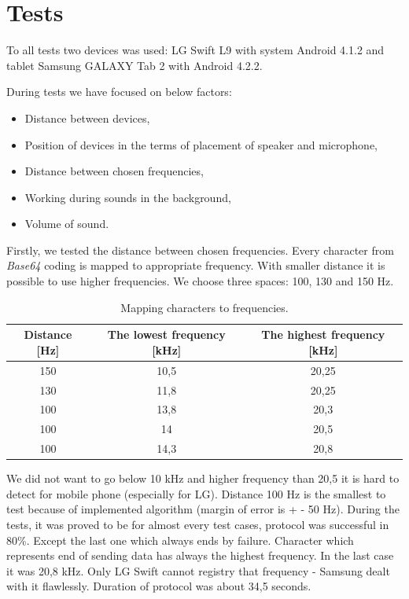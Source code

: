 \documentclass[11pt,titlepage]{article}
\theoremstyle{plain}
\begin{document}
\section{Tests}
To all tests two devices was used: LG Swift L9 with system Android 4.1.2 and tablet Samsung GALAXY Tab 2 with Android 4.2.2. 

During tests we have focused on below factors:
\begin{itemize}
\item Distance between devices,
\item Position of devices in the terms of placement of speaker and microphone,
\item Distance between chosen frequencies,
\item Working during sounds in the background,
\item Volume of sound.
\end{itemize}

Firstly, we tested  the distance between chosen frequencies. Every character from \textit{Base64} coding is mapped to appropriate frequency. With smaller distance it is possible to use higher frequencies. We choose three spaces: 100, 130 and 150 Hz.
\begin{table}[H]
	\centering
	\begin{tabular}{| c | c | c |}
		\hline
		Distance [Hz] & The lowest frequency [kHz] & The highest frequency [kHz]\\
		\hline
		150 & 10,5 & 20,25 \\
		\hline
		130 & 11,8 & 20,25 \\
		\hline
		100 & 13,8 & 20,3 \\
		\hline
		100 & 14 & 20,5 \\
		\hline
		100 & 14,3 & 20,8 \\
		\hline
	\end{tabular}
	\caption{Mapping characters to frequencies.}
\end{table}

We did not want to go below 10 kHz and higher frequency than 20,5 it is hard to detect for mobile phone (especially for LG). Distance 100 Hz is the smallest to test because of implemented algorithm (margin of error is + - 50 Hz). During the tests, it was proved to be for almost every test cases, protocol was successful in 80\%. Except the last one which always ends by failure. Character which represents end of sending data has always the highest frequency. In the last case it was 20,8 kHz. Only LG Swift cannot registry that frequency - Samsung dealt with it flawlessly. Duration of protocol was about 34,5 seconds.
\end{document}
